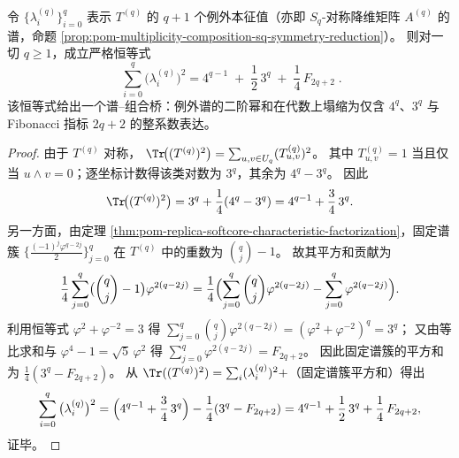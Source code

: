 \begin{conclusion}\label{con:xi-terminal-replica-softcore-exceptional-spectrum-square-sum}
令 \(\{\lambda_i^{(q)}\}_{i=0}^{q}\) 表示 \(T^{(q)}\) 的 \(q+1\) 个例外本征值（亦即 \(S_q\)-对称降维矩阵 \(A^{(q)}\) 的谱，命题 \ref{prop:pom-multiplicity-composition-sq-symmetry-reduction}）。
则对一切 \(q\ge 1\)，成立严格恒等式
\[
\boxed{\;
\sum_{i=0}^{q}\big(\lambda_i^{(q)}\big)^2
=4^{q-1}
\;+\;\frac12\,3^{q}
\;+\;\frac14\,F_{2q+2}\; }.
\]
该恒等式给出一个谱--组合桥：例外谱的二阶幂和在代数上塌缩为仅含 \(4^q\)、\(3^q\) 与 Fibonacci 指标 \(2q+2\) 的整系数表达。
\end{conclusion}
\begin{proof}
由于 \(T^{(q)}\) 对称，
\(
\Tr\!\bigl((T^{(q)})^2\bigr)=\sum_{u,v\in U_q}(T^{(q)}_{u,v})^2
\)。
其中 \(T^{(q)}_{u,v}=1\) 当且仅当 \(u\wedge v=0\)；逐坐标计数得该类对数为 \(3^q\)，其余为 \(4^q-3^q\)。
因此
\[
\Tr\!\bigl((T^{(q)})^2\bigr)
=3^q+\frac14(4^q-3^q)
=4^{q-1}+\frac34\,3^q.
\]
另一方面，由定理 \ref{thm:pom-replica-softcore-characteristic-factorization}，固定谱簇
\(
\{\frac{(-1)^j\varphi^{q-2j}}{2}\}_{j=0}^{q}
\)
在 \(T^{(q)}\) 中的重数为 \(\binom{q}{j}-1\)。
故其平方和贡献为
\[
\frac14\sum_{j=0}^{q}\bigl(\binom{q}{j}-1\bigr)\varphi^{2(q-2j)}
=\frac14\Bigl(\sum_{j=0}^{q}\binom{q}{j}\varphi^{2(q-2j)}-\sum_{j=0}^{q}\varphi^{2(q-2j)}\Bigr).
\]
利用恒等式 \(\varphi^2+\varphi^{-2}=3\) 得
\(
\sum_{j=0}^{q}\binom{q}{j}\varphi^{2(q-2j)}=(\varphi^2+\varphi^{-2})^q=3^q
\)；
又由等比求和与 \(\varphi^4-1=\sqrt5\,\varphi^2\) 得
\(
\sum_{j=0}^{q}\varphi^{2(q-2j)}=F_{2q+2}
\)。
因此固定谱簇的平方和为 \(\frac14(3^q-F_{2q+2})\)。
从 \(\Tr((T^{(q)})^2)=\sum_i(\lambda_i^{(q)})^2+\)（固定谱簇平方和）得出
\[
\sum_{i=0}^{q}\big(\lambda_i^{(q)}\big)^2
=\Bigl(4^{q-1}+\frac34\,3^q\Bigr)-\frac14(3^q-F_{2q+2})
=4^{q-1}+\frac12\,3^q+\frac14\,F_{2q+2},
\]
证毕。
\end{proof}

\endinput
